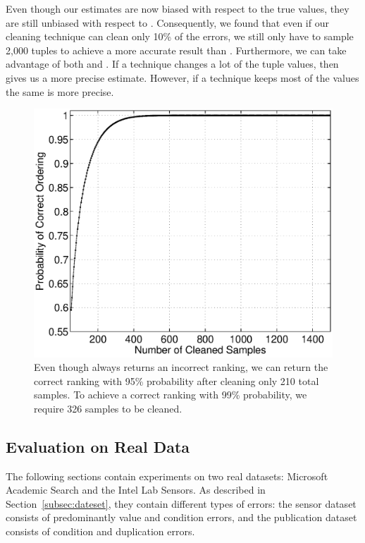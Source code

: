 Even though our estimates are now biased with respect to the true values, they are still unbiased with respect to \allclean.
Consequently, we found that even if our cleaning technique can clean only 10\% of the errors, we still only have to sample 2,000 tuples to achieve a more accurate result than \alldirty.
Furthermore, we can take advantage of both \sampleclean and \biascorrected.
If a technique changes a lot of the tuple values, then \sampleclean gives us a more precise estimate.
However, if a technique keeps most of the values the same \biascorrected is more precise.




\begin{figure}[t]\vspace{-1.8em}
\centering
\includegraphics[scale=0.3]{exp/msacademic-paper-ranking.eps}
\caption{Even though \alldirty always returns an incorrect ranking, we can return the correct ranking with 95\% probability after cleaning only 210 total samples. To achieve a correct ranking with 99\% probability, we require 326 samples to be cleaned.}\vspace{-1em}
\label{exp:ms-academic-ranking}
\end{figure}

\subsection{Evaluation on Real Data}
The following sections contain experiments on two real datasets: Microsoft Academic Search and the Intel Lab Sensors.
As described in Section~\ref{subsec:dateset}, they contain different types of errors: the sensor dataset consists of predominantly value and condition errors, and the publication dataset consists of condition and duplication errors.

